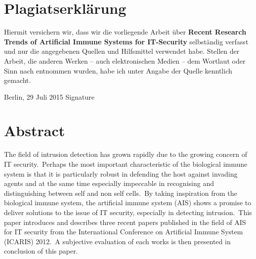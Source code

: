 \chapter*{Plagiatserkl{\"a}rung}
    Hiermit versichern wir, dass wir die vorliegende Arbeit \"{u}ber \textbf{Recent Research Trends of Artificial Immune Systems for IT-Security} selbst\"{a}ndig verfasst und nur die angegebenen Quellen und Hilfsmittel verwendet habe. Stellen der Arbeit, die anderen Werken -- auch elektronischen Medien -- dem Wortlaut oder Sinn nach entnommen wurden, habe ich unter Angabe der Quelle kenntlich gemacht.

\vspace{4cm}

\noindent Berlin, 29 Juli 2015 \hfill Signature

    
\newpage
\chapter*{Abstract}

    The field of intrusion detection has grown rapidly due to the growing concern of IT security.\ Perhaps the most important characteristic of the biological immune system is that it is particularly robust in defending the host against invading agents and at the same time especially impeccable in recognising and distinguishing between self and non self cells.\ By taking inspiration from the biological immune system, the artificial immune system (AIS) shows a promise to deliver solutions to the issue of IT security, especially in detecting intrusion.\ This paper introduces and describes three recent papers published in the field of AIS for IT security from the International Conference on Artificial Immune System (ICARIS) 2012.\ A subjective evaluation of each works is then presented in conclusion of this paper.
    
